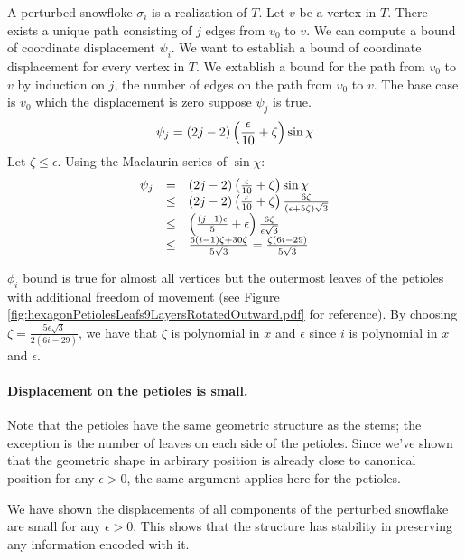 A perturbed snowfloke $\sigma_i$ is a realization of $T$.  
Let $v$ be a vertex in $T$.  
There exists a unique path consisting of $j$ edges from $v_0$ to $v$.  
We can compute a bound of coordinate displacement $\psi_i$.  
We want to establish a bound of coordinate displacement for every vertex in $T$.  
We extablish a bound for the path from $v_0$ to $v$ by induction on $j$, the number of edges on the path from $v_0$ to $v$.  
The base case is $v_0$ which the displacement is zero suppose $\psi_j$ is true.  
$$\psi_j = (2j-2) \left( \frac{\epsilon}{10} + \zeta \right) \sin \chi$$
Let $\zeta \leq \epsilon$.  
Using the Maclaurin series of $\sin \chi$:
$$
\begin{array}{rcl}
\psi_j &=& (2j-2) \left( \frac{\epsilon}{10} + \zeta \right) \sin \chi\\
&\leq& (2j-2) \left( \frac{\epsilon}{10} + \zeta \right)  \frac{6 \zeta}{\left( \epsilon + 5 \zeta \right)\sqrt{3}}\\
&\leq& \left( \frac{(j-1)\epsilon}{5} + \epsilon \right) \frac{6 \zeta}{\epsilon\sqrt{3}}\\
&\leq& \frac{6(i-1)\zeta + 30\zeta}{5\sqrt{3}}= \frac{\zeta(6i-29)}{5 \sqrt{3}}
\end{array}
$$

$\phi_i$ bound is true for almost all vertices but the outermost leaves of the petioles with additional freedom of movement (see Figure \ref{fig:hexagonPetiolesLeafs9LayersRotatedOutward.pdf} for reference).  
By choosing $\zeta = \frac{5\epsilon  \sqrt{3}}{2(6i-29)}$, we have that $\zeta$ is polynomial in $x$ and $\epsilon$ since $i$ is polynomial in $x$ and $\epsilon$.
\paragraph{Displacement on the petioles is small.}
Note that the petioles have the same geometric structure as the stems; the exception is the number of leaves on each side of the petioles. 
Since we've shown that the geometric shape in arbirary position is already close to canonical position for any $\epsilon>0$, the same argument applies here for the petioles.

We have shown the displacements of all components of the perturbed snowflake are small for any $\epsilon > 0$.  
This shows that the structure has stability in preserving any information encoded with it.